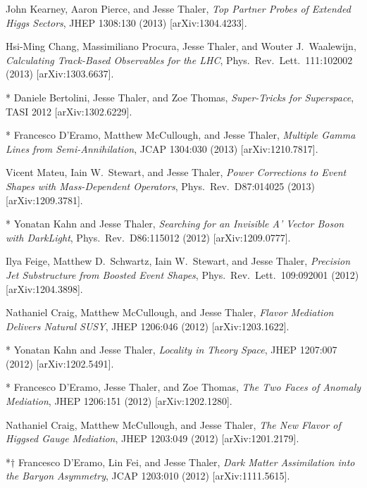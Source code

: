 \begin{list}{[]\addtocounter{jessecount}{-1}}{\leftmargin=3em \itemsep=4pt}
\item
 John Kearney, Aaron Pierce, and Jesse Thaler,
\emph{Top Partner Probes of Extended Higgs Sectors},
JHEP 1308:130 (2013)
[arXiv:1304.4233].

\item
 Hsi-Ming Chang, Massimiliano Procura, Jesse Thaler, and Wouter J.\ Waalewijn,
\emph{Calculating Track-Based Observables for the LHC},
Phys.\ Rev.\ Lett.\ 111:102002 (2013)
[arXiv:1303.6637].

\item
* Daniele Bertolini, Jesse Thaler, and Zoe Thomas,
\emph{Super-Tricks for Superspace},
TASI 2012
[arXiv:1302.6229].

\item
* Francesco D'Eramo, Matthew McCullough, and Jesse Thaler,
\emph{Multiple Gamma Lines from Semi-Annihilation},
JCAP 1304:030 (2013)
[arXiv:1210.7817].

\item
 Vicent Mateu, Iain W.\ Stewart, and Jesse Thaler,
\emph{Power Corrections to Event Shapes with Mass-Dependent Operators},
Phys.\ Rev.\ D87:014025 (2013)
[arXiv:1209.3781].

\item
* Yonatan Kahn and Jesse Thaler,
\emph{Searching for an Invisible A' Vector Boson with DarkLight},
Phys.\ Rev.\ D86:115012 (2012)
[arXiv:1209.0777].

\item
 Ilya Feige, Matthew D.\ Schwartz, Iain W.\ Stewart, and Jesse Thaler,
\emph{Precision Jet Substructure from Boosted Event Shapes},
Phys.\ Rev.\ Lett.\ 109:092001 (2012)
[arXiv:1204.3898].

\item
 Nathaniel Craig, Matthew McCullough, and Jesse Thaler,
\emph{Flavor Mediation Delivers Natural SUSY},
JHEP 1206:046 (2012)
[arXiv:1203.1622].

\item
* Yonatan Kahn and Jesse Thaler,
\emph{Locality in Theory Space},
JHEP 1207:007 (2012)
[arXiv:1202.5491].

\item
* Francesco D'Eramo, Jesse Thaler, and Zoe Thomas,
\emph{The Two Faces of Anomaly Mediation},
JHEP 1206:151 (2012)
[arXiv:1202.1280].

\item
 Nathaniel Craig, Matthew McCullough, and Jesse Thaler,
\emph{The New Flavor of Higgsed Gauge Mediation},
JHEP 1203:049 (2012)
[arXiv:1201.2179].

\item
*$\dagger$ Francesco D'Eramo, Lin Fei, and Jesse Thaler,
\emph{Dark Matter Assimilation into the Baryon Asymmetry},
JCAP 1203:010 (2012)
[arXiv:1111.5615].


\end{list}
